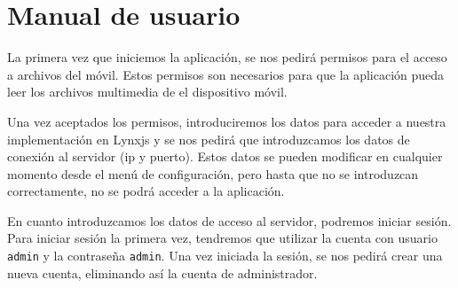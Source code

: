 \chapter{Manual de usuario}
\label{chap:manual_usuario}

La primera vez que iniciemos la aplicación, se nos pedirá permisos para el acceso a archivos del móvil. Estos permisos son necesarios para que la aplicación pueda leer los archivos multimedia de el dispositivo móvil.

Una vez aceptados los permisos, introduciremos los datos para acceder a nuestra implementación en Lynxjs y se nos pedirá que introduzcamos los datos de conexión al servidor (ip y puerto). Estos datos se pueden modificar en cualquier momento desde el menú de configuración, pero hasta que no se introduzcan correctamente, no se podrá acceder a la aplicación.

En cuanto introduzcamos los datos de acceso al servidor, podremos iniciar sesión. Para iniciar sesión la primera vez, tendremos que utilizar la cuenta con usuario \texttt{admin} y la contraseña \texttt{admin}. Una vez iniciada la sesión, se nos pedirá crear una nueva cuenta, eliminando así la cuenta de administrador.


